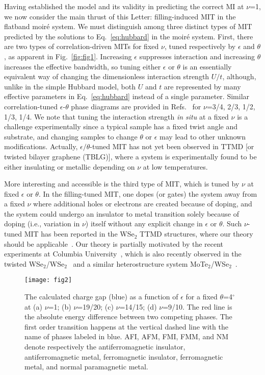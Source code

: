 \documentclass[aps,prl,floatfix,twocolumn]{revtex4-2}
\begin{document}
Having established the model and its validity in predicting the correct {MI} at $\nu$=1, we now consider the main thrust of this Letter: filling-induced {MIT} in the flatband moir\'e system.  We must distinguish among three distinct types of MIT predicted by the solutions to Eq.~\eqref{eq:hubbard} in the moir\'e system.  First, there are two types of correlation-driven MITs for fixed $\nu$, tuned respectively by $\epsilon$ and $\theta$, as apparent in Fig.~\ref{fig:fig1}.  Increasing $\epsilon$ suppresses interaction and increasing $\theta$ increases the effective bandwidth, so tuning either $\epsilon$ or $\theta$ is an essentially equivalent way of changing the dimensionless interaction strength $U/t$, although, unlike in the simple Hubbard model, both $ U $ and $ t $ are represented by many effective {parameters in} Eq.~\eqref{eq:hubbard} instead of a single {parameter}. Similar correlation-tuned $\epsilon$-$\theta$  phase diagrams are provided in Refs.~ for $\nu$=3/4, 2/3, 1/2, 1/3, 1/4. We note that tuning the interaction strength \textit{in situ} at a fixed $\nu$ is a challenge experimentally since a typical sample has a fixed twist angle and {substrate}, and changing samples to change $\theta$ or $\epsilon$ may lead to other unknown modifications. {Actually}, $ \epsilon/\theta $-tuned MIT has not yet been observed in TTMD [or {twisted bilayer graphene (TBLG)}], where a system is experimentally found to be either insulating or metallic depending on {$\nu$} at low temperatures.  

More interesting and accessible is the third type of MIT, which is tuned by {$\nu$} at fixed $\epsilon$ or $\theta$. In the filling-tuned MIT, one dopes (or gates) the system away from a fixed $\nu$ where additional holes or electrons are created because of doping, and the system could undergo an insulator to metal transition solely because of doping (i.e., variation in $\nu$) itself without any explicit change in $\epsilon$ or $\theta$. Such $\nu$-tuned MIT has been reported in the WSe$_2$ TTMD structures, where our theory should be applicable~\cite{wang2020correlated}. Our theory is partially motivated by the recent experiments at Columbia University~\cite{wang2020correlated}, which is also recently observed in the twisted WSe$ _{2} $/WSe$ _{2} $~\cite{ghiotto2021quantum} and a similar heterostructure system MoTe$ _{2} $/WSe$ _{2} $~\cite{li2021continuous}.
\begin{figure}[t]
	\centering
	\texttt{[image: fig2]}
	\caption{The calculated charge gap {(blue)} as a function of $ \epsilon $ for a fixed $ \theta $=4$^\circ$ at (a) $ \nu $=1; (b) $ \nu $=19/20; (c) $ \nu$=14/15; (d) $ \nu $=9/10. {The red line} is the absolute energy difference between two competing phases. The first order transition happens at the vertical dashed line with the name of phases labeled in blue. AFI, AFM, FMI, FMM, and NM denote respectively the antiferromagnetic insulator, antiferromagnetic metal, ferromagnetic insulator, ferromagnetic metal, and normal paramagnetic metal.}
	\label{fig:fig2}
\end{figure}
\end{document}
